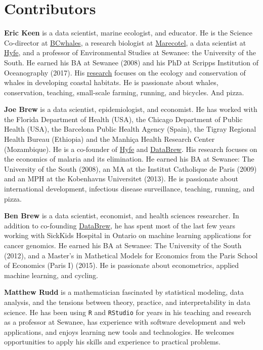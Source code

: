 \documentclass[]{book}
\begin{document}
\hypertarget{contributors}{%
\section*{Contributors}\label{contributors}}

\textbf{Eric Keen} is a data scientist, marine ecologist, and educator. He is the Science Co-director at \href{www.bcwhales.org}{BCwhales}, a research biologist at \href{www.marecotel.org}{Marecotel}, a data scientist at \href{www.hyfe.ai}{Hyfe}, and a professor of Environmental Studies at Sewanee: the University of the South. He earned his BA at Sewanee (2008) and his PhD at Scripps Institution of Oceanography (2017). His \href{https://scholar.google.com/citations?hl=en\&user=SrLDYrEAAAAJ\&view_op=list_works\&sortby=pubdate}{research} focuses on the ecology and conservation of whales in developing coastal habitats. He is passionate about whales, conservation, teaching, small-scale farming, running, and bicycles. And pizza.

\textbf{Joe Brew} is a data scientist, epidemiologist, and economist. He has worked with the Florida Department of Health (USA), the Chicago Department of Public Health (USA), the Barcelona Public Health Agency (Spain), the Tigray Regional Health Bureau (Ethiopia) and the Manhiça Health Research Center (Mozambique). He is a co-founder of \href{www.hyfe.ai}{Hyfe} and \href{www.databrew.cc}{DataBrew}. His research focuses on the economics of malaria and its elimination. He earned his BA at Sewanee: The University of the South (2008), an MA at the Institut Catholique de Paris (2009) and an MPH at the Kobenhavns Universitet (2013). He is passionate about international development, infectious disease surveillance, teaching, running, and pizza.

\textbf{Ben Brew} is a data scientist, economist, and health sciences researcher. In addition to co-founding \href{www.databrew.cc}{DataBrew}, he has spent most of the last few years working with SickKids Hospital in Ontario on machine learning applications for cancer genomics. He earned his BA at Sewanee: The University of the South (2012), and a Master's in Mathetical Models for Economics from the Paris School of Economics (Paris I) (2015). He is passionate about econometrics, applied machine learning, and cycling.

\textbf{Matthew Rudd} is a mathematician fascinated by statistical modeling, data analysis, and the tensions between theory, practice, and interpretability in data science. He has been using \texttt{R} and \texttt{RStudio} for years in his teaching and research as a professor at Sewanee, has experience with software development and web applications, and enjoys learning new tools and technologies. He welcomes opportunities to apply his skills and experience to practical problems.
\end{document}
